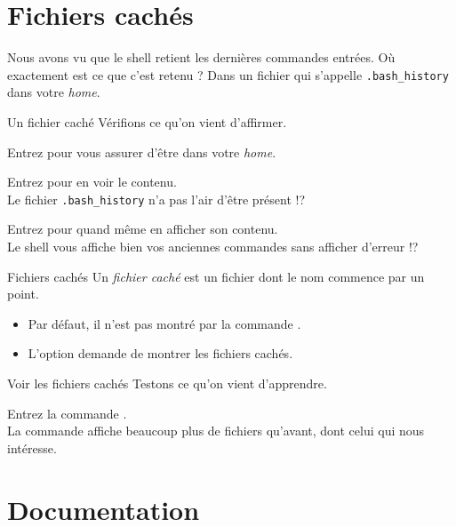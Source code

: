 \documentclass[a4paper,11pt]{style-esi/td}
\begin{document}
\section{Fichiers cachés}

	Nous avons vu que le shell retient les dernières commandes entrées.
	Où exactement est ce que c'est retenu ?
	Dans un fichier qui s'appelle \verb|.bash_history| dans votre \emph{home}.

	\begin{Experience}{Un fichier caché}
		Vérifions ce qu'on vient d'affirmer.
		\begin{steps}
		\item Entrez  pour vous assurer d'être dans votre \emph{home}.
		\item Entrez  pour en voir le contenu.
			\\Le fichier \verb|.bash_history| n'a pas l'air d'être présent !?
		\item Entrez  pour quand même en afficher son contenu.
			\\Le shell vous affiche bien vos anciennes commandes sans afficher d'erreur !?
		\end{steps}
	\end{Experience}

	\medskip
	\begin{theorie}{Fichiers cachés}
		Un \emph{fichier caché} 
		est un fichier dont le nom commence par un point.
		\begin{itemize}
		\item Par défaut, il n'est pas montré par la commande \kbd{ls}.
		\item L'option  demande de montrer les fichiers cachés.
		\end{itemize}
	\end{theorie}

	\begin{Experience}{Voir les fichiers cachés}
		Testons ce qu'on vient d'apprendre.
		\begin{steps}
		\item Entrez la commande \kbd{ls -a}.
			\\La commande affiche beaucoup plus de fichiers qu'avant,
			dont celui qui nous intéresse.
		\end{steps}
	\end{Experience}

\section{Documentation}
\end{document}
